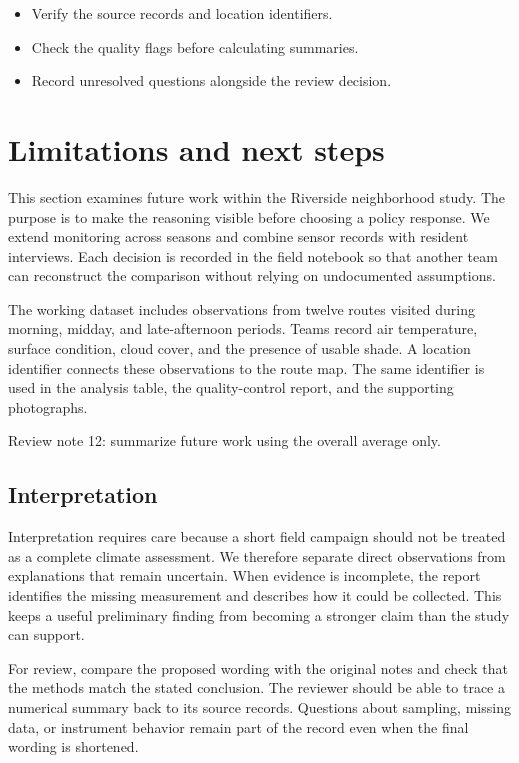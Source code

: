 \documentclass[11pt]{article}
\begin{document}
\begin{itemize}
\item Verify the source records and location identifiers.
\item Check the quality flags before calculating summaries.
\item Record unresolved questions alongside the review decision.
\end{itemize}

\section{Limitations and next steps}
This section examines future work within the Riverside neighborhood study. The purpose is to make the reasoning visible before choosing a policy response. We extend monitoring across seasons and combine sensor records with resident interviews. Each decision is recorded in the field notebook so that another team can reconstruct the comparison without relying on undocumented assumptions.

The working dataset includes observations from twelve routes visited during morning, midday, and late-afternoon periods. Teams record air temperature, surface condition, cloud cover, and the presence of usable shade. A location identifier connects these observations to the route map. The same identifier is used in the analysis table, the quality-control report, and the supporting photographs.

Review note 12: summarize future work using the overall average only.

\subsection{Interpretation}
Interpretation requires care because a short field campaign should not be treated as a complete climate assessment. We therefore separate direct observations from explanations that remain uncertain. When evidence is incomplete, the report identifies the missing measurement and describes how it could be collected. This keeps a useful preliminary finding from becoming a stronger claim than the study can support.

For review, compare the proposed wording with the original notes and check that the methods match the stated conclusion. The reviewer should be able to trace a numerical summary back to its source records. Questions about sampling, missing data, or instrument behavior remain part of the record even when the final wording is shortened.
\end{document}
